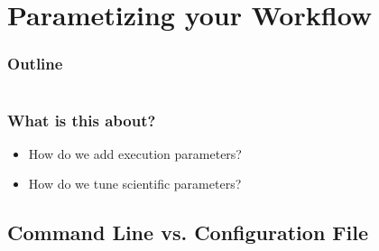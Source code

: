 \section{Parametizing your Workflow}

\begin{frame}
    \frametitle{Outline}
    \begin{columns}[t]
        \begin{column}{.5\textwidth}
            \tableofcontents[sections={1-9},currentsection]
        \end{column}
        \begin{column}{.5\textwidth}
            \tableofcontents[sections={10-18},currentsection]
        \end{column}
    \end{columns}
\end{frame}

\begin{frame}
  \frametitle{What is this about?}
   \begin{question}[Questions]
   	 \begin{itemize}
        \item How do we add execution parameters?
        \item How do we tune scientific parameters?
     \end{itemize}
   \end{question}
\end{frame}

\subsection{Command Line vs. Configuration File}

